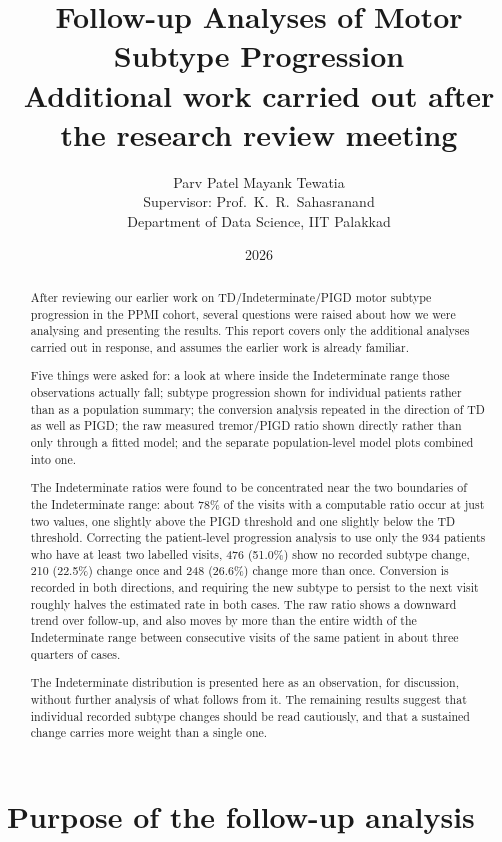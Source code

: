 \documentclass[11pt,a4paper]{article}
\title{\textbf{Follow-up Analyses of Motor Subtype Progression}\\[0.6em]
       \large Additional work carried out after the research review meeting}
\author{Parv Patel \quad\textbullet\quad Mayank Tewatia\\[0.4em]
        \small Supervisor: Prof.\ K.~R.\ Sahasranand\\
        \small Department of Data Science, IIT Palakkad}
\date{2026}
\begin{document}
\maketitle

\begin{abstract}
\noindent
After reviewing our earlier work on TD/Indeterminate/PIGD motor subtype
progression in the PPMI cohort, several questions were raised about how we were
analysing and presenting the results. This report covers only the additional
analyses carried out in response, and assumes the earlier work is already
familiar.

Five things were asked for: a look at where inside the Indeterminate range those
observations actually fall; subtype progression shown for individual patients
rather than as a population summary; the conversion analysis repeated in the
direction of TD as well as PIGD; the raw measured tremor/PIGD ratio shown
directly rather than only through a fitted model; and the separate
population-level model plots combined into one.

The Indeterminate ratios were found to be concentrated near the two boundaries of
the Indeterminate range: about 78\% of the visits with a computable ratio occur
at just two values, one slightly above the PIGD threshold and one slightly below
the TD threshold. Correcting the patient-level progression analysis to use only
the 934 patients who have at least two labelled visits, 476 (51.0\%) show no
recorded subtype change, 210 (22.5\%) change once and 248 (26.6\%) change more
than once. Conversion is recorded in both directions, and requiring the new
subtype to persist to the next visit roughly halves the estimated rate in both
cases. The raw ratio shows a downward trend over follow-up, and also moves by
more than the entire width of the Indeterminate range between consecutive visits
of the same patient in about three quarters of cases.

The Indeterminate distribution is presented here as an observation, for
discussion, without further analysis of what follows from it. The remaining
results suggest that individual recorded subtype changes should be read
cautiously, and that a sustained change carries more weight than a single one.
\end{abstract}

\section{Purpose of the follow-up analysis}
\end{document}
